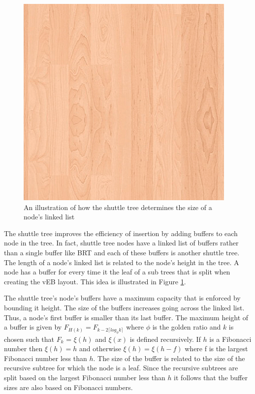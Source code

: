 \documentclass{style}
\begin{document}
\begin{figure}

\begin{center}
	\includegraphics[width=0.8\columnwidth]{figures/veb.png}
\end{center}

\caption{An illustration of how the shuttle tree determines the size of a node's linked list}
\label{fig:buffers}
\end{figure}


The shuttle tree improves the efficiency of insertion by adding buffers to
each node in the tree. In fact, shuttle tree nodes have a linked list of
buffers rather than a single buffer like BRT and each of these buffers is
another shuttle tree. The length of a node's linked list is related to the
node's height in the tree. A node has a buffer for every time it the leaf of a
sub trees that is split when creating the vEB layout. This idea is illustrated
in Figure \ref{fig:buffers}.

The shuttle tree's node's buffers have a maximum capacity that is enforced by
bounding it height. The size of the buffers increases going across the linked
list. Thus, a node's first buffer is smaller than its last buffer. The maximum
height of a buffer is given by $F_{H(k)} = F_{k-2 \lceil log_{\phi} k \rceil}
$ where $\phi$ is the golden ratio and $k$ is chosen such that $F_k$ =
$\xi(h)$ and $\xi(x)$ is defined recursively. If $h$ is a Fibonacci number
then $\xi(h) = h$ and otherwise $\xi(h) = \xi(h-f)$ where f is the largest
Fibonacci number less than $h$. The size of the buffer is related to the size
of the recursive subtree for which the node is a leaf. Since the recursive
subtrees are split based on the largest Fibonacci number less than $h$ it
follows that the buffer sizes are also based on Fibonacci numbers.
\end{document}
